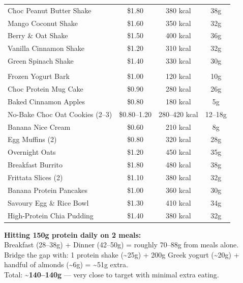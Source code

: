 \documentclass[12pt, a4paper]{book}
\begin{document}
\begin{tabularx}{\linewidth}{|X|c|c|c|}
  \hline
  \hline
  \rowcolor{primary!10}
  \multicolumn{4}{|l|}{\textbf{Protein Shakes}} \\
  \hline
  Choc Peanut Butter Shake & \$1.80 & 380 kcal & 38g \\
  \hline
  Mango Coconut Shake      & \$1.60 & 350 kcal & 32g \\
  \hline
  Berry \& Oat Shake       & \$1.50 & 400 kcal & 36g \\
  \hline
  Vanilla Cinnamon Shake   & \$1.20 & 310 kcal & 32g \\
  \hline
  Green Spinach Shake      & \$1.40 & 330 kcal & 30g \\
  \hline
  \hline
  \rowcolor{primary!10}
  \multicolumn{4}{|l|}{\textbf{Desserts \& Sweet Treats}} \\
  \hline
  Frozen Yogurt Bark       & \$1.00 & 120 kcal & 10g \\
  \hline
  Choc Protein Mug Cake    & \$0.90 & 280 kcal & 26g \\
  \hline
  Baked Cinnamon Apples    & \$0.80 & 180 kcal & 5g \\
  \hline
  No-Bake Choc Oat Cookies (2--3) & \$0.80--1.20 & 280--420 kcal & 12--18g \\
  \hline
  Banana Nice Cream        & \$0.60 & 210 kcal & 8g \\
  \hline
  \hline
  \rowcolor{accent!20}
  Egg Muffins (2)          & \$0.80 & 320 kcal & 28g \\
  \hline
  \rowcolor{accent!20}
  Overnight Oats           & \$1.20 & 450 kcal & 35g \\
  \hline
  \rowcolor{accent!20}
  Breakfast Burrito        & \$1.80 & 480 kcal & 38g \\
  \hline
  \rowcolor{accent!20}
  Frittata Slices (2)      & \$1.10 & 380 kcal & 32g \\
  \hline
  \rowcolor{accent!20}
  Banana Protein Pancakes  & \$1.00 & 360 kcal & 30g \\
  \hline
  \rowcolor{accent!20}
  Savoury Egg \& Rice Bowl & \$1.30 & 410 kcal & 34g \\
  \hline
  \rowcolor{accent!20}
  High-Protein Chia Pudding & \$1.40 & 380 kcal & 32g \\
  \hline
\end{tabularx}

\vspace{1cm}

\begin{tipbox}
  \textbf{Hitting 150g protein daily on 2 meals:}\\
  Breakfast (28--38g) + Dinner (42--50g) = roughly 70--88g from meals alone. \\
  Bridge the gap with: 1 protein shake (\textasciitilde25g) + 200g Greek yogurt (\textasciitilde20g) + handful of almonds (\textasciitilde6g) = \textasciitilde51g extra. \\
  Total: \textbf{\textasciitilde140--140g} --- very close to target with minimal extra eating.
\end{tipbox}
\end{document}
